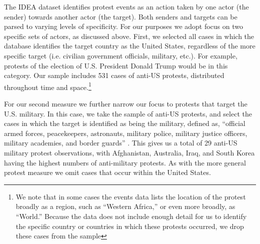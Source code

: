 
The IDEA dataset identifies protest events as an action taken by one actor (the sender) towards another actor (the target). Both senders and targets can be parsed to varying levels of specificity. For our purposes we adopt focus on two specific sets of actors, as discussed above. First, we selected all cases in which the database identifies the target country as the United States, regardless of the more specific target (i.e. civilian government officials, military, etc.). For example, protests of the election of U.S. President Donald Trump would be in this category. Our sample includes 531 cases of anti-US protests, distributed throughout time and space.\footnote{We note that in some cases the events data lists the location of the protest broadly as a region, such as ``Western Africa,'' or even more broadly, as ``World.'' Because the data does not include enough detail for us to identify the specific country or countries in which these protests occurred, we drop these cases from the sample}

For our second measure we further narrow our focus to protests that target the U.S. military. In this case, we take the sample of anti-US protests, and select the cases in which the target is identified as being the military, defined as, ``official armed forces, peacekeepers, astronauts, military police, military justice officers, military academies, and border guards'' \cite{Bond2003}. This gives us a total of 29 anti-US military protest observations, with Afghanistan, Australia, Iraq, and South Korea having the highest numbers of anti-military protests. As with the more general protest measure we omit cases that occur within the United States.

